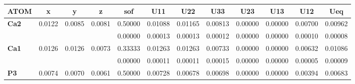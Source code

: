 \documentclass[]{scrartcl}
\begin{document}
\begin{table}[]
	\centering
	\setlength\tabcolsep{2pt}
	\begin{tabular}{|l|l|l|l|l|l|l|l|l|l|l|l|}
		\hline
		\multicolumn{1}{|c|}{\textbf{ATOM}} & \multicolumn{1}{c|}{\textbf{x}} & \multicolumn{1}{c|}{\textbf{y}} & \multicolumn{1}{c|}{\textbf{z}} & \multicolumn{1}{c|}{\textbf{sof}} & \multicolumn{1}{c|}{\textbf{U11}} & \multicolumn{1}{c|}{\textbf{U22}} & \multicolumn{1}{c|}{\textbf{U33}} & \multicolumn{1}{c|}{\textbf{U23}} & \multicolumn{1}{c|}{\textbf{U13}} & \multicolumn{1}{c|}{\textbf{U12}} & \multicolumn{1}{c|}{\textbf{Ueq}} \\ \hline
		\textbf{Ca2}                        & 0.0122                          & 0.0085                          & 0.0081                          & 0.50000                           & 0.01088                           & 0.01165                           & 0.00813                           & 0.00000                           & 0.00000                           & 0.00700                           & 0.00962                           \\ \hline
		\textbf{}                           &                                 &                                 &                                 & 0.00000                           & 0.00013                           & 0.00013                           & 0.00012                           & 0.00000                           & 0.00000                           & 0.00010                           & 0.00008                           \\ \hline
		\textbf{Ca1}                        & 0.0126                          & 0.0126                          & 0.0073                          & 0.33333                           & 0.01263                           & 0.01263                           & 0.00733                           & 0.00000                           & 0.00000                           & 0.00632                           & 0.01086                           \\ \hline
		\textbf{}                           &                                 &                                 &                                 & 0.00000                           & 0.00011                           & 0.00011                           & 0.00015                           & 0.00000                           & 0.00000                           & 0.00005                           & 0.00009                           \\ \hline
		\textbf{P3}                         & 0.0074                          & 0.0070                          & 0.0061                          & 0.50000                           & 0.00728                           & 0.00678                           & 0.00698                           & 0.00000                           & 0.00000                           & 0.00394                           & 0.00683                           \\ \hline

\end{tabular}
\end{table}
\end{document}
